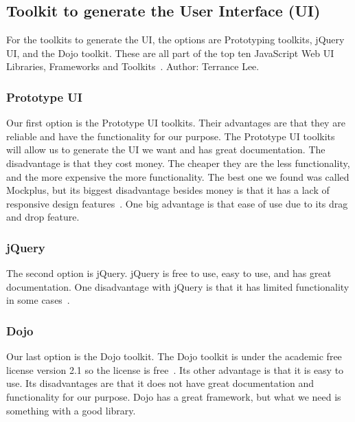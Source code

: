 \documentclass[10pt,draftclsnofoot,onecolumn]{IEEEtran}
\begin{document}
    \subsection{Toolkit to generate the User Interface (UI)}
 	For the toolkits to generate the UI, the options are Prototyping toolkits, jQuery UI, and the Dojo toolkit.
	These are all part of the top ten JavaScript Web UI Libraries, Frameworks and Toolkits~\cite{10-javascript-web-ui-libraries-frameworks-and-toolkits}.
	Author: Terrance Lee.

   	\subsubsection{Prototype UI}
   	Our first option is the Prototype UI toolkits. 
	Their advantages are that they are reliable and have the functionality for our purpose. 
	The Prototype UI toolkits will allow us to generate the UI we want and has great documentation.
	The disadvantage is that they cost money. 
	The cheaper they are the less functionality, and the more expensive the more functionality. 
	The best one we found was called Mockplus, but its biggest disadvantage besides money is that it has a lack of responsive design
	features~\cite{pros-and-cons-of-four-prototyping-tools}.
	One big advantage is that ease of use due to its drag and drop feature.

   	\subsubsection{jQuery}
   	The second option is jQuery. jQuery is free to use, easy to use, and has great documentation.
	One disadvantage with jQuery is that it has limited functionality in some cases~\cite{jquery-disadvantages-and-advantages}.

   	\subsubsection{Dojo}
   	Our last option is the Dojo toolkit.
	The Dojo toolkit is under the academic free license version 2.1 so the license is free~\cite{dojo-toolkit-license}.
	Its other advantage is that it is easy to use.
	Its disadvantages are that it does not have great documentation and functionality for our purpose.
	Dojo has a great framework, but what we need is something with a good library.
\end{document}
